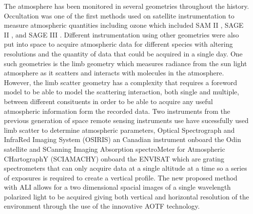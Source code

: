 \documentclass[12pt, draft]{article}
\begin{document}
The atmosphere has been monitored in several geometries throughout the history. Occultation was one of the first methods used on satellite instrumentation to measure atmospheric quantities including ozone which included SAM II \citep{McCormick1979}, SAGE II \citep{McCormick1987}, and SAGE III \citep{Thomason2003}. Different instrumentation using other geometries were also put into space to acquire atmospheric data for different species with altering resolutions and the quantity of data that could be acquired in a single day. One such geometries is the limb geometry which measures radiance from the sun light atmosphere as it scatters and interacts with molecules in the atmosphere. However, the limb scatter geometry has a complexity that requires a foreword model to be able to model the scattering interaction, both single and multiple, between different consituents in order to be able to acquire any useful atmospheric information form the recorded data. Two instruments from the previous generation of space remote sensing instruments use have sucessfully used limb scatter to determine atmospheric parameters, Optical Spectrograph and InfraRed Imaging System (OSIRIS) an Canadian instrument onboard the Odin satellite \citep{Llewellyn2004} and SCanning Imaging Absorption spectroMeter for Atmospheric CHartographY (SCIAMACHY) onboard the ENVISAT \citep{Bovensmann1999} which are grating spectrometers that can only acquire data at a single altitude at a time so a series of exposures is required to create a vertical profile. The new proposed method with ALI allows for a two dimensional spacial images of a single wavelength polarized light to be acquired giving both vertical and horizontal resolution of the environment through the use of the innovative AOTF technology.
\end{document}
